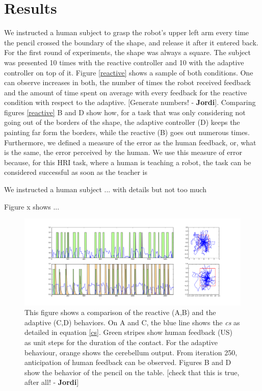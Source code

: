 \documentclass[letterpaper, 10 pt, conference]{ieeeconf}  %
\newcommand\jp[1]{{\color{red}}{\color{red}}{\footnotesize \color{red}[#1 - \textbf{Jordi}]}} %
\begin{document}
{\section{Results}
\label{sec:results}

We instructed a human subject to grasp the robot's upper left arm every time the pencil crossed the boundary of the shape, and release it after it entered back. For the first round of experiments, the shape was always a square. The subject was presented 10 times with the reactive controller and 10 with the adaptive controller on top of it. 
Figure \ref{reactive} shows a sample of both conditions. One can observe increases in both, the number of times the robot received feedback and the amount of time spent on average with every feedback for the reactive condition with respect to the adaptive. \jp{Generate numbers!}. Comparing figures \ref{reactive} B and D show how, for a task that was only considering not going out of the borders of the shape, the adaptive controller (D) keeps the painting far form the borders, while the reactive (B) goes out numerous times. 
Furthermore, we defined a measure of the error as the human feedback, or, what is the same, the error perceived by the human. We use this measure of error because, for this HRI task, where a human is teaching a robot, the task can be considered successful as soon as the teacher is 

We instructed a human subject ...
with details but not too much

Figure x shows ...


\begin{figure}[bc]
\centering
\includegraphics[width=20cm]{reactive_adaptive}
\caption{This figure shows a comparison of the reactive (A,B) and the adaptive (C,D) behaviors. On A and C, the blue line shows the \emph{cs} as detailed in equation \ref{cs}. Green stripes show human feedback (US) as unit steps for the duration of the contact. For the adaptive behaviour, orange shows the cerebellum output. From iteration 250, anticipation of human feedback can be observed. Figures B and D show the behavior of the pencil on the table. \jp{check that this is true, after all!}}
\label{fig:reactive}
\end{figure}



}
\end{document}
